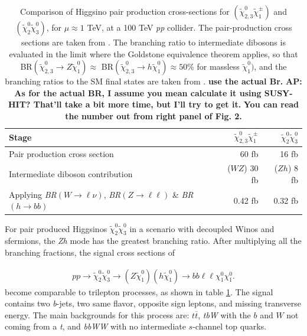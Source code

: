 \documentclass[a4paper,11pt]{article}
\newcommand{\Shufang}[1]{{\bf\color{Maroon}  #1}}
\newcommand{\Adarsh}[1]{{\bf\color{RoyalBlue} AP: #1}}
\newcommand{\N}{\widetilde{\chi}^0}
\begin{document}
\begin{table}
  \centering
  \begin{tabular}{l|rr}
    \toprule
    Stage & $\N_{2,3}\widetilde{\chi}^\pm_{1}$ & $\N_2\N_3$\\
    \midrule
    Pair production cross section & 60 fb & 16 fb\\
    Intermediate diboson contribution & ($WZ$) 30 fb  & ($Zh$) 8 fb \\
    Applying \emph{BR}$(W\rightarrow \ell\nu)$, \emph{BR}$(Z\rightarrow \ell\ell)$ \& \emph{BR}$(h\rightarrow bb)$ & 0.42 fb & 0.32 fb\\
    \bottomrule
  \end{tabular}
  \caption{Comparison of Higgsino pair production cross-sections for
    $(\widetilde{\chi}_{2,3}^0\widetilde{\chi}^\pm_{1})$ and
    $(\N_{2}\N_{3})$, for $\mu\approx 1$ TeV, at a 100
    TeV \emph{pp} collider. The pair-production cross sections are taken from
    \cite{Gori:2014oua}. The branching ratio to intermediate dibosons is
    evaluated in the limit where the Goldstone equivalence theorem applies, so
    that BR$(\widetilde{\chi}_{2,3}^0\rightarrow Z \widetilde{ \chi}_{1}^0)\approx$
    BR$(\widetilde{\chi}_{2,3}^0\rightarrow h\widetilde{\chi}_1^0)\approx 50\% $ for massless $\widetilde{\chi}_{1}^0)$, 
    and the branching ratios to the SM final states are taken from
    \cite{Olive:2016xmw}.  
    \Shufang{use the actual Br.} \Adarsh{As for the actual BR, I assume you mean
  calculate it using SUSY-HIT? That'll take a bit more time, but I'll try to
  get it.} \Shufang{You can read the number out from right panel of Fig. 2.} }
  \label{tab:xsections}
\end{table}


For pair produced Higgsinos $\widetilde\chi_2^0\widetilde\chi_3^0$ in a scenario with
decoupled Winos and  sfermions, the \emph{Zh} mode has the greatest
branching ratio.  After multiplying all the branching fractions, the signal cross
sections of 

\begin{align}
pp\rightarrow \widetilde{\chi}_{2}^{0}\widetilde{\chi}_{3}^{0}\rightarrow
(Z\widetilde{\chi}_1^{0})(h\widetilde{\chi}_1^{0})\rightarrow
bb\ell\ell \chi_1^0\chi_1^0.
\end{align}
become comparable  to trilepton processes, as shown in    table \ref{tab:xsections}.    The signal contains two
\emph{b}-jets, two same flavor, opposite sign leptons, and missing transverse
energy. The main backgrounds for this process are: $t\overline{t}$, \emph{tbW} with
the $b$ and $W$ not coming from a \emph{t}, and \emph{bbWW} with no intermediate
$s$-channel top quarks.  
\end{document}
